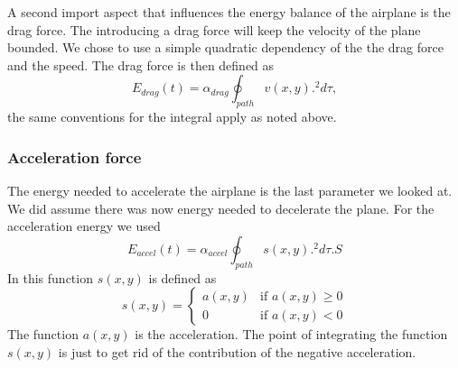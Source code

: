 A second import aspect that influences the energy balance of the airplane is the drag force.
The introducing a drag force will keep the velocity of the plane bounded.
We chose to use a simple quadratic dependency of the the drag force and the speed.
The drag force is then defined as 
\begin{equation}
E_{drag}(t)  =  \alpha_{drag} \oint_{path} v(x,y).^2  d \tau,
\end{equation}
the same conventions for the integral apply as noted above.


\subsubsection{Acceleration force}

The energy needed to accelerate the airplane is the last parameter we looked at.
We did assume there was now energy needed to decelerate the plane.
For the acceleration energy we used
\begin{equation}
E_{accel}(t)  =  \alpha_{accel} \oint_{path} s(x,y).^2  d \tau.S
\end{equation}
In this function $ s(x,y) $ is defined as
\begin{equation}
s(x,y) = 
\begin{cases}
   a(x,y) & \text{if } a(x,y) \geq 0 \\
   0       & \text{if } a(x,y) < 0
  \end{cases}
\end{equation}
The function $ a(x,y) $ is the acceleration.
The point of integrating the function $ s(x,y) $ is just to get rid of the contribution of the negative acceleration.






